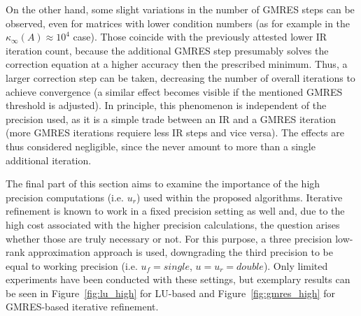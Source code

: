 On the other hand, some slight variations in the number of GMRES steps can be observed, even for matrices with lower condition numbers (as for example in the $\kappa_\infty(A) \approx 10^4$ case). Those coincide with the previously attested lower IR iteration count, because the additional GMRES step presumably solves the correction equation at a higher accuracy then the prescribed minimum. Thus, a larger correction step can be taken, decreasing the number of overall iterations to achieve convergence (a similar effect becomes visible if the mentioned GMRES threshold is adjusted). In principle, this phenomenon is independent of the precision used, as it is a simple trade between an IR and a GMRES iteration (more GMRES iterations requiere less IR steps and vice versa). The effects are thus considered negligible, since the never amount to more than a single additional iteration.

The final part of this section aims to examine the importance of the high precision computations (i.e. $u_r$) used within the proposed algorithms. Iterative refinement is known to work in a fixed precision setting \cite{skeel_iterative_1980} as well and, due to the high cost associated with the higher precision calculations, the question arises whether those are truly necessary or not. For this purpose, a three precision low-rank approximation approach is used, downgrading the third precision to be equal to working precision (i.e. $u_f = single$, $u=u_r=double$). Only limited experiments have been conducted with these settings, but exemplary results can be seen in Figure~\hyperref[fig:lu_high]{\ref{fig:lu_high}} for LU-based and Figure~\hyperref[fig:gmres_high]{\ref{fig:gmres_high}} for GMRES-based iterative refinement.


